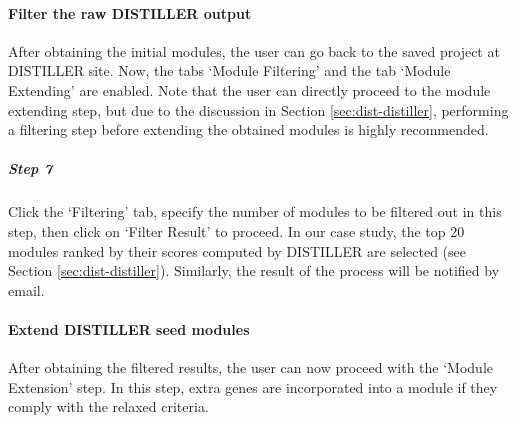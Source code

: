 \paragraph{Filter the raw DISTILLER output} After obtaining the initial modules, 
the user can go back to the saved project at DISTILLER site.  Now, the tabs
`Module Filtering' and the tab `Module Extending' are enabled.  Note that the
user can directly proceed to the module extending step, but due to the
discussion in Section \ref{sec:dist-distiller}, performing a filtering step
before extending the obtained modules is highly recommended.

\begin{small} %
\subparagraph{Step 7} Click the `Filtering' tab, specify the number of 
modules to be filtered out in this step, then click on `Filter Result' to
proceed.  In our case study, the top 20 modules ranked by their scores
computed by DISTILLER are selected (see Section
\ref{sec:dist-distiller}). Similarly, the result of the process will be
notified by email.
\end{small}

\paragraph{Extend DISTILLER seed modules} After obtaining the filtered results, 
the user can now proceed with the `Module Extension' step.
%
In this step, extra genes are incorporated into a module if they comply with
the relaxed criteria.

